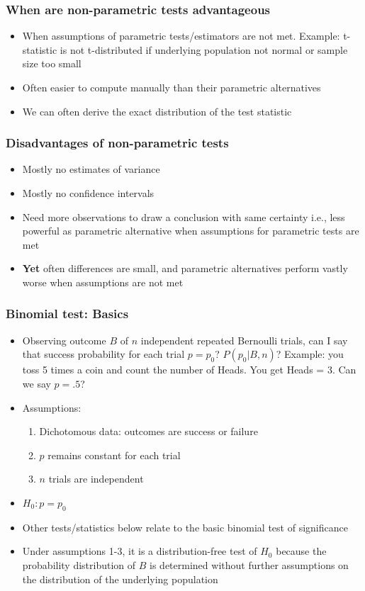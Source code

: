 \documentclass[xcolor=table,dvipsnames]{beamer}
\begin{document}
\begin{frame}
\frametitle{When are non-parametric tests advantageous}
\begin{itemize}
\item When assumptions of parametric tests/estimators are not met. Example: t-statistic is not t-distributed if underlying population not normal or sample size too small \pause
\item Often easier to compute manually than their parametric alternatives \pause
\item We can often derive the exact distribution of the test statistic
\end{itemize}
\end{frame}

\begin{frame}
\frametitle{Disadvantages of non-parametric tests}
\begin{itemize}
\item Mostly no estimates of variance \pause
\item Mostly no confidence intervals \pause
\item Need more observations to draw a conclusion with same certainty \pause i.e., less powerful as parametric alternative when assumptions for parametric tests are met \pause
\item \textbf{Yet} often differences are small, and parametric alternatives perform vastly worse when assumptions are not met 
\end{itemize}
\end{frame}

\begin{frame}
\frametitle{Binomial test: Basics}
\begin{itemize}	
\item Observing outcome $B$ of $n$ independent repeated Bernoulli trials, can I say that success probability for each trial $p=p_0$? $P(p_0|B,n)$? \pause Example: you toss 5 times a coin and count the number of Heads. You get Heads = 3. Can we say $p=.5$? \pause
\item Assumptions:
\begin{enumerate}
	\item Dichotomous data: outcomes are success or failure
	\item $p$ remains constant for each trial
	\item $n$ trials are independent
\end{enumerate}
\item $H_0: p = p_0$ \pause
\item Other tests/statistics below relate to the basic binomial test of significance \pause
\item Under assumptions 1-3, it is a distribution-free test of $H_0$ because the probability distribution of $B$ is determined without further assumptions on the distribution of the underlying population
\end{itemize}
\end{frame}
\end{document}
